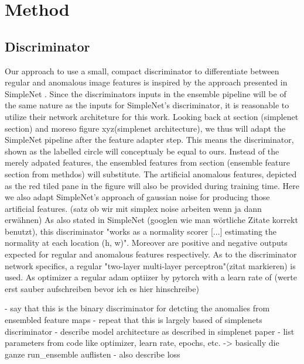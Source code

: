 \chapter{Method}
\label{chap:method}


\section{Discriminator}
\label{sec:discriminator}
Our approach to use a small, compact discriminator to differentiate between regular and anomalous image features is inspired by the approach 
presented in SimpleNet \cite{liu2023simplenet}. Since the discriminators inputs in the ensemble pipeline will be of the same nature as 
the inputs for SimpleNet's discriminator, it is reasonable to utilize their network architeture for this work. Looking back at section 
(simplenet section) and moreso figure xyz(simplenet architecture), we thus will adapt the SimpleNet pipeline after the feature adapter step. 
This means the discriminator, shown as the labelled circle will conceptualy be equal to ours. Instead of the merely adpated features, 
the ensembled features from section (ensemble feature section from methdos) will substitute. The artificial anomalous features, 
depicted as the red tiled pane in the figure will also be provided during training time. Here we also adapt SimpleNet's approach of 
gaussian noise for producing those artificial features. (satz ob wir mit simplex noise arbeiten wenn ja dann erwähnen) As also stated in 
SimpleNet (googlen wie man wörtliche Zitate korrekt benutzt), this discriminator "works as a normality scorer [...] estimating the normality 
at each location (h, w)". Moreover are positive and negative outputs expected for regular and anomalous features respectively.
As to the discriminator network specifics, a regular "two-layer multi-layer perceptron"(zitat markieren) is used. As optimizer a regular 
adam optiizer by pytorch with a learn rate of (werte erst sauber aufschreiben bevor ich es hier hinschreibe)



- say that this is the binary discriminator for detcting the anomalies from ensembled feature maps
- repeat that this is largely based of simplenets discriminator
- describe model architecture as described in simplenet paper
- list parameters from code like optimizer, learn rate, epochs, etc. 
-> basically die ganze run_ensemble auflisten
- also describe loss


